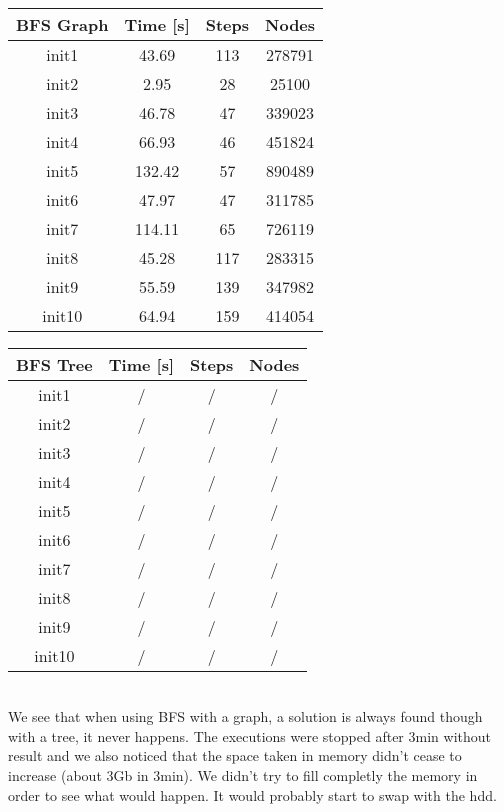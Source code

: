 \documentclass[a4paper,10pt]{article}
\begin{document}
	\vspace{0.5cm}\\
	\begin{tabular}{|c||c|c|c|}
		\hline 
		\textbf{BFS Graph} & \textbf{Time [s]} & \textbf{Steps} & \textbf{Nodes} \\ 
		\hline 
		init1 & 43.69 & 113 & 278791 \\ 
		\hline 
		init2 & 2.95 & 28 & 25100 \\ 
		\hline 
		init3 & 46.78 & 47 & 339023 \\ 
		\hline 
		init4 & 66.93 & 46 & 451824 \\ 
		\hline 
		init5 & 132.42 & 57 & 890489 \\ 
		\hline 
		init6 & 47.97 & 47 & 311785 \\ 
		\hline 
		init7 & 114.11 & 65 & 726119 \\ 
		\hline 
		init8 & 45.28 & 117 & 283315 \\ 
		\hline 
		init9 & 55.59 & 139 & 347982 \\ 
		\hline 
		init10 & 64.94 & 159 & 414054 \\ 
		\hline 
	\end{tabular}
	\hspace{0.5cm}
	\begin{tabular}{|c||c|c|c|}
		\hline 
		\textbf{BFS Tree} & \textbf{Time [s]} & \textbf{Steps} & \textbf{Nodes} \\ 
		\hline 
		init1 & / & / & / \\ 
		\hline 
		init2 & / & / & / \\ 
		\hline 
		init3 & / & / & / \\ 
		\hline 
		init4 & / & / & / \\ 
		\hline 
		init5 & / & / & / \\ 
		\hline 
		init6 & / & / & / \\ 
		\hline 
		init7 & / & / & / \\ 
		\hline 
		init8 & / & / & / \\ 
		\hline 
		init9 & / & / & / \\ 
		\hline 
		init10 & / & / & / \\ 
		\hline 
	\end{tabular}
	\vspace{0.5cm}\\
	We see that when using BFS with a graph, a solution is always found though with a tree, it never happens. The executions were stopped after 3min without result and we also noticed that the space taken in memory didn't cease to increase (about 3Gb in 3min). We didn't try to fill completly the memory in order to see what would happen. It would probably start to swap with the hdd.
	\vspace{1cm}
	
\end{document}
